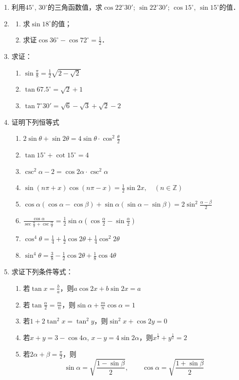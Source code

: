 \begin{enumerate}
\item 利用$45^{\circ}$, $30^{\circ}$的三角函数值，求$\cos22^{\circ}30'$; $\sin22^{\circ}30'$; $\cos15^{\circ}$, $\sin15^{\circ}$的值．
\item \begin{enumerate}
    \item 求$\sin18^{\circ}$的值；
    \item 求证$\cos36^{\circ}-\cos72^{\circ}=\frac{1}{2}$．
\end{enumerate}

\item 求证：
\begin{enumerate}
    \item $\sin\frac{\pi}{8}=\frac{1}{2}\sqrt{2-\sqrt{2}}$
    \item $\tan 67.5^{\circ}=\sqrt{2}+1$
    \item $\tan 7^{\circ}30'=\sqrt{6}-\sqrt{3}+\sqrt{2}-2$
\end{enumerate}
\item 证明下列恒等式
\begin{enumerate}
    \item $2\sin\theta+\sin2\theta=4\sin\theta\cdot \cos^2\frac{\theta}{2}$
    \item $\tan 15^{\circ}+\cot 15^{\circ}=4$
    \item $\csc^2\alpha-2=\cos2\alpha\cdot \csc^2\alpha$
    \item $\sin(n\pi+x)\cos(n\pi-x)=\frac{1}{2}\sin 2x,\quad (n\in \mathbb{Z})$
    \item $\cos\alpha(\cos\alpha-\cos\beta)+\sin\alpha(\sin\alpha-\sin\beta)=2\sin^2\frac{\alpha-\beta}{2}$
    \item $\frac{\cos\alpha}{\sec\frac{\alpha}{2}+\csc\frac{\alpha}{2}}=\frac{1}{2}\sin\alpha\left(\cos\frac{\alpha}{2}-\sin\frac{\alpha}{2}\right)$
    \item $\cos^4\theta=\frac{1}{4}+\frac{1}{2}\cos2\theta+\frac{1}{4}\cos^2 2\theta$
    \item $\sin^4\theta=\frac{3}{8}-\frac{1}{2}\cos2\theta+\frac{1}{8}\cos4\theta$
\end{enumerate}

\item 求证下列条件等式：
\begin{enumerate}
    \item 若$\tan x=\frac{b}{a}$，则$a\cos 2x+b\sin 2x=a$
    \item 若$\tan\frac{\alpha}{2}=\frac{m}{n}$，则$\sin\alpha+\frac{m}{n}\cos\alpha=1$
    \item 若$1+2\tan^2 x=\tan^2 y$，则$\sin^2x+\cos 2y=0$
    \item 若$x+y=3-\cos4\alpha$, $x-y=4\sin2\alpha$，则$x^{\tfrac{1}{2}}+y^{\tfrac{1}{2}}=2$
    \item 若$2\alpha+\beta=\frac{\pi}{2}$，则
    \[\sin\alpha=\sqrt{\frac{1-\sin\beta}{2}},\qquad \cos\alpha=\sqrt{\frac{1+\sin\beta}{2}}\]
\end{enumerate}
\end{enumerate}

